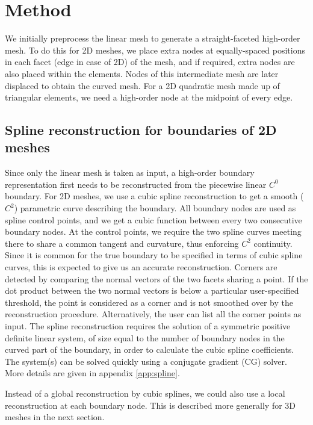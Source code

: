 \section{Method}

We initially preprocess the linear mesh to generate a straight-faceted high-order mesh. To do this for 2D meshes, we place extra nodes at equally-spaced positions in each facet (edge in case of 2D) of the mesh, and if required, extra nodes are also placed within the elements. Nodes of this intermediate mesh are later displaced to obtain the curved mesh. For a 2D quadratic mesh made up of triangular elements, we need a high-order node at the midpoint of every edge.

\subsection{Spline reconstruction for boundaries of 2D meshes}
Since only the linear mesh is taken as input, a high-order boundary representation first needs to be reconstructed from the piecewise linear $C^0$ boundary. For 2D meshes, we use a cubic spline reconstruction to get a smooth ($C^2$) parametric curve describing the boundary. All boundary nodes are used as spline control points, and we get a cubic function between every two consecutive boundary nodes. At the control points, we require the two spline curves meeting there to share a common tangent and curvature, thus enforcing $C^2$ continuity. Since it is common for the true boundary to be specified in terms of cubic spline curves, this is expected to give us an accurate reconstruction. Corners are detected by comparing the normal vectors of the two facets sharing a point. If the dot product between the two normal vectors is below a particular user-specified threshold, the point is considered as a corner and is not smoothed over by the reconstruction procedure. Alternatively, the user can list all the corner points as input. The spline reconstruction requires the solution of a symmetric positive definite linear system, of size equal to the number of boundary nodes in the curved part of the boundary, in order to calculate the cubic spline coefficients. The system(s) can be solved quickly using a conjugate gradient (CG) solver. More details are given in appendix \ref{app:spline}.

Instead of a global reconstruction by cubic splines, we could also use a local reconstruction at each boundary node. This is described more generally for 3D meshes in the next section.

